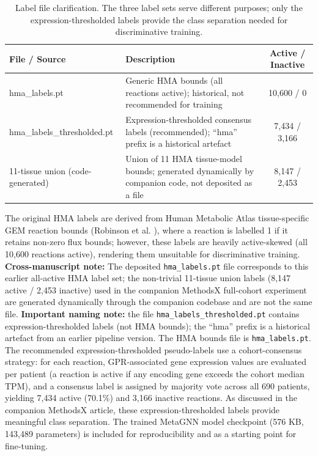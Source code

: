 \documentclass[12pt,a4paper]{article}
\begin{document}
\begin{table}[!htbp]
\centering
\caption{Label file clarification. The three label sets serve different purposes; only the expression-thresholded labels provide the class separation needed for discriminative training.}
\label{tab:label_files}
\footnotesize
\begin{tabularx}{\textwidth}{@{}>{\ttfamily\raggedright\arraybackslash}p{3.8cm} X c@{}}
\toprule
\textbf{\textrm{File / Source}} & \textbf{Description} & \textbf{Active / Inactive} \\
\midrule
hma\_labels.pt & Generic HMA bounds (all reactions active); historical, not recommended for training & 10,600 / 0 \\
hma\_labels\_thresholded.pt & Expression-thresholded consensus labels (recommended); ``hma'' prefix is a historical artefact & 7,434 / 3,166 \\
\textrm{11-tissue union (code-generated)} & Union of 11 HMA tissue-model bounds; generated dynamically by companion code, not deposited as a file & 8,147 / 2,453 \\
\bottomrule
\end{tabularx}
\end{table}

The original HMA labels are derived from Human Metabolic Atlas tissue-specific GEM reaction bounds (Robinson et al. \cite{Robinson2020}), where a reaction is labelled 1 if it retains non-zero flux bounds; however, these labels are heavily active-skewed (all 10,600 reactions active), rendering them unsuitable for discriminative training. \textbf{Cross-manuscript note:} The deposited \texttt{hma\_labels.pt} file corresponds to this earlier all-active HMA label set; the non-trivial 11-tissue union labels (8,147 active / 2,453 inactive) used in the companion MethodsX full-cohort experiment are generated dynamically through the companion codebase and are not the same file. \textbf{Important naming note:} the file \texttt{hma\_labels\_thresholded.pt} contains expression-thresholded labels (not HMA bounds); the ``hma'' prefix is a historical artefact from an earlier pipeline version. The HMA bounds file is \texttt{hma\_labels.pt}. The recommended expression-thresholded pseudo-labels use a cohort-consensus strategy: for each reaction, GPR-associated gene expression values are evaluated per patient (a reaction is active if any encoding gene exceeds the cohort median TPM), and a consensus label is assigned by majority vote across all 690 patients, yielding 7,434 active (70.1\%) and 3,166 inactive reactions. As discussed in the companion MethodsX article, these expression-thresholded labels provide meaningful class separation. The trained MetaGNN model checkpoint (576 KB, 143,489 parameters) is included for reproducibility and as a starting point for fine-tuning.
\end{document}

